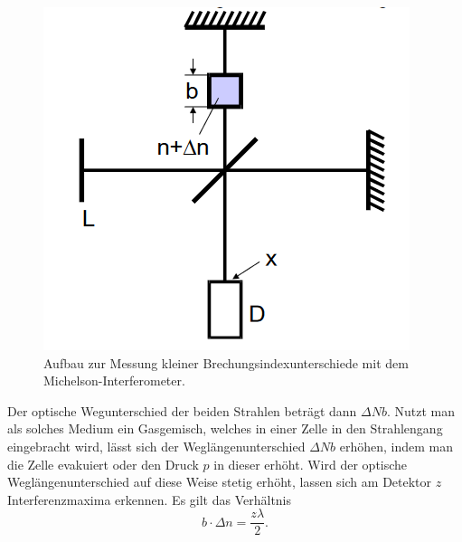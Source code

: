 \begin{figure}
    \centering
    \includegraphics{content/brechungsindex.png}
    \caption{Aufbau zur Messung kleiner Brechungsindexunterschiede mit dem Michelson-Interferometer.}
    \label{fig:index}
  \end{figure}

Der optische Wegunterschied der beiden Strahlen beträgt dann $\Delta N b$. 
Nutzt man als solches Medium ein Gasgemisch, welches in einer Zelle in den Strahlengang eingebracht
wird, lässt sich der Weglängenunterschied $\Delta N b$ erhöhen, indem man die Zelle evakuiert oder den Druck $p$ in dieser erhöht.
Wird der optische Weglängenunterschied auf diese Weise stetig erhöht, lassen sich am Detektor $z$ Interferenzmaxima erkennen.
Es gilt das Verhältnis
\begin{equation}
    b \cdot  \Delta n = \frac{z\lambda}{2} .
    \label{eqn:deltan}
\end{equation} 

